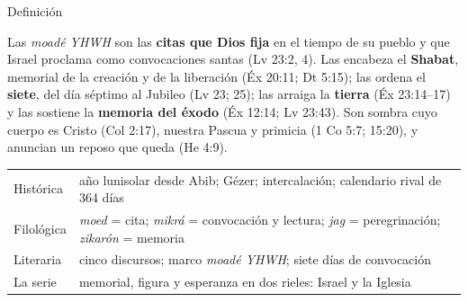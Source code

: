 \documentclass[hyperref={bookmarks=false},aspectratio=169]{beamer}
\newcommand{\destacar}[1]{\textbf{\textcolor{tierraroja}{#1}}}
\begin{document}
\begin{frame}{Definición}
\begin{tcolorbox}[colback=papiro,colframe=tierraroja,boxrule=1pt,arc=3pt,left=5pt,right=5pt,top=3pt,bottom=3pt]
\small Las \emph{moadé YHWH} son las \destacar{citas que Dios fija} en el tiempo de su pueblo y que Israel proclama como convocaciones santas (Lv 23:2, 4). Las encabeza el \destacar{Shabat}, memorial de la creación y de la liberación (Éx 20:11; Dt 5:15); las ordena el \destacar{siete}, del día séptimo al Jubileo (Lv 23; 25); las arraiga la \destacar{tierra} (Éx 23:14--17) y las sostiene la \destacar{memoria del éxodo} (Éx 12:14; Lv 23:43). Son sombra cuyo cuerpo es Cristo (Col 2:17), nuestra Pascua y primicia (1 Co 5:7; 15:20), y anuncian un reposo que queda (He 4:9).
\end{tcolorbox}
\scriptsize\renewcommand{\arraystretch}{1.05}
\begin{tabular}{@{}L{2.1cm}L{9.8cm}@{}}
\toprule
Histórica & año lunisolar desde Abib; Gézer; intercalación; calendario rival de 364 días \\
Filológica & \emph{moed} = cita; \emph{mikrá} = convocación y lectura; \emph{jag} = peregrinación; \emph{zikarón} = memoria \\
Literaria & cinco discursos; marco \emph{moadé YHWH}; siete días de convocación \\
La serie & memorial, figura y esperanza en dos rieles: Israel y la Iglesia \\
\bottomrule
\end{tabular}
\end{frame}
\end{document}
